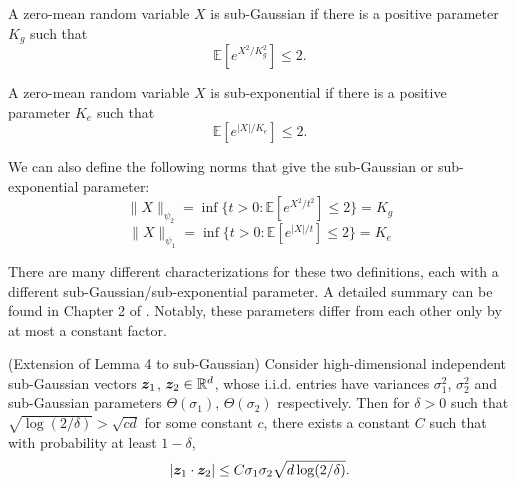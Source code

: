 \begin{definition} \label{def:sub_gaussian}
    A zero-mean random variable $X$ is sub-Gaussian if there is a positive parameter $K_g$ such that
    \[
        \mathbb{E}[e^{X^2/K_g^2}] \leq 2. 
    \]   
\end{definition}

\begin{definition} \label{def:sub_exponentual}
    A zero-mean random variable $X$ is sub-exponential if there is a positive parameter $K_e$ such that
    \[
        \mathbb{E}[e^{|X|/K_e}] \leq 2. 
    \]   
\end{definition}

We can also define the following norms that give the sub-Gaussian or sub-exponential parameter: 
\[
    \|X\|_{\psi_2} = \inf \{ t > 0: \mathbb{E}[e^{X^2/t^2}] \leq 2\} = K_g
\]
\[
    \|X\|_{\psi_1} = \inf \{ t > 0: \mathbb{E}[e^{|X|/t}] \leq 2\} = K_e
\]

\begin{remark}
    There are many different characterizations for these two definitions, each with a different sub-Gaussian/sub-exponential parameter. A detailed summary can be found in Chapter 2 of \cite{vershynin2018high}. Notably, these parameters differ from each other only by at most a constant factor. 
\end{remark}

\begin{lemma} (Extension of Lemma 4 \cite{shen2022data} to sub-Gaussian) \label{lemma:sub_gauss_dot_product_bound}
    Consider high-dimensional independent sub-Gaussian vectors ${\bm{z}}_1$, ${\bm{z}}_2 \in \mathbb{R}^d$, whose i.i.d. entries have variances $\sigma_1^2$, $\sigma_2^2$ and sub-Gaussian parameters $\Theta(\sigma_1)$, $\Theta(\sigma_2)$ respectively. Then for $\delta > 0$ such that $\sqrt{\log(2/\delta)} > \sqrt{cd}$ for some constant $c$, there exists a constant $C$ such that with probability at least $1-\delta$, 
    \[
        |{\bm{z}}_1 \cdot {\bm{z}}_2| \leq C\sigma_1\sigma_2\sqrt{d\log(2/\delta)}. 
    \]
\end{lemma}

